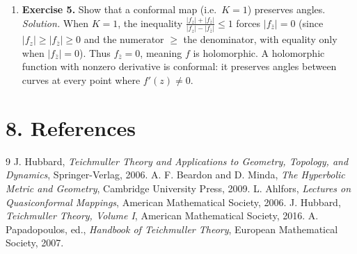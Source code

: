 \begin{enumerate}[leftmargin=*,itemsep=0.9em]
\item \textbf{Exercise 5.} Show that a conformal map (i.e.\ $K = 1$) preserves angles. \emph{Solution.} When $K = 1$, the inequality $\frac{|f_z| + |f_{\bar{z}}|}{|f_z| - |f_{\bar{z}}|} \leq 1$ forces $|f_{\bar{z}}| = 0$ (since $|f_z| \geq |f_{\bar{z}}| \geq 0$ and the numerator $\geq$ the denominator, with equality only when $|f_{\bar{z}}| = 0$). Thus $f_{\bar{z}} = 0$, meaning $f$ is holomorphic. A holomorphic function with nonzero derivative is conformal: it preserves angles between curves at every point where $f'(z) \neq 0$.

\end{enumerate}
\section*{8. References}
\begin{thebibliography}{9}
 J. Hubbard, \emph{Teichmuller Theory and Applications to Geometry, Topology, and Dynamics}, Springer-Verlag, 2006.
 A. F. Beardon and D. Minda, \emph{The Hyperbolic Metric and Geometry}, Cambridge University Press, 2009.
 L. Ahlfors, \emph{Lectures on Quasiconformal Mappings}, American Mathematical Society, 2006.
 J. Hubbard, \emph{Teichmuller Theory, Volume I}, American Mathematical Society, 2016.
 A. Papadopoulos, ed., \emph{Handbook of Teichmuller Theory}, European Mathematical Society, 2007.
\end{thebibliography}
